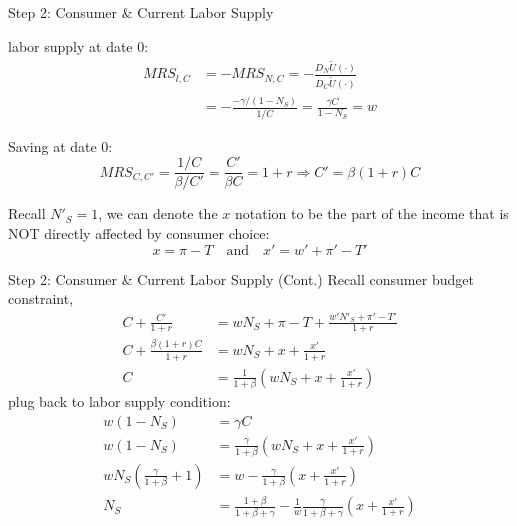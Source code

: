 \documentclass[11pt,aspectratio=169,usenames,dvipsnames]{beamer}
\let\tempone\itemize
\let\temptwo\enditemize
\renewenvironment{itemize}{\tempone\addtolength{\itemsep}{\fill}}{\temptwo}
\begin{document}
\begin{frame}{Step 2: Consumer \& Current Labor Supply}
\label{slide:Step_2__Consumer_Analysis}
    \begin{itemize}
        \item \alert{labor supply} at date 0:
        \begin{align*}
           MRS_{l, C}
                & = -MRS_{N, C} = -\frac{D_{N} \tilde{U}( \cdot )}{D_{C} \tilde{U}( \cdot )}
            \\
                & = -\frac{-\gamma/( 1-N_{S} )}{1/C} = \frac{\gamma C}{1-N_{S}} = w
        \end{align*}
        \item \alert{Saving} at date 0:
        \begin{equation*}
            MRS_{C, C'} = \frac{1/C}{\beta/C'} = \frac{C'}{\beta C} = 1+r \Rightarrow C' = \beta( 1+r ) C
        \end{equation*}
        \item Recall $ N'_{S} = 1$, we can denote the $ x $ notation to be the part of the income that is NOT \alert{directly affected by consumer choice}:
        \begin{equation*}
            x = \pi - T \quad \text{and} \quad x' = w' + \pi' - T'
        \end{equation*}
    \end{itemize}
\end{frame}

\begin{frame}{Step 2: Consumer \& Current Labor Supply (Cont.)}
\label{slide:Step_2__Consumer_Analysis_for_Current_Labor_Supply__Cont__}
\footnotesize
Recall consumer budget constraint,
%
\begin{align*}
    C + \frac{C'}{1+r}
        & = w N_{S} + \pi - T
        + \frac{ w' N'_{S} + \pi' - T' }{1+r}
    \\
    C + \frac{\beta( 1+r )C}{1+r}
        & = wN_{S} + x + \frac{x'}{1+r}
    \\
    C
        & = \frac{1}{1+\beta}
            \left(
                w N_{S} + x + \frac{x'}{1+r}
            \right)
\end{align*}
%
plug back to labor supply condition:
%
\begin{align*}
    w( 1-N_{S} )
        & = \gamma C
    \\
    w( 1-N_{S} )
        &= \frac{\gamma}{1+\beta}
            \left(
                w N_{S} + x + \frac{x'}{1+r}
            \right)
    \\
    w N_{S} \left(
        \frac{\gamma}{1+\beta} + 1
    \right)
        & = w - \frac{\gamma}{1+\beta} \left(
            x + \frac{x'}{1+r}
        \right)
    \\
    N_{S}
        &= \frac{1+\beta}{1+\beta+\gamma} - \frac{1}{w} \frac{\gamma}{1+\beta+\gamma}\left(
            x + \frac{x'}{1+r}
        \right)
\end{align*}
%
\end{frame}
\end{document}
